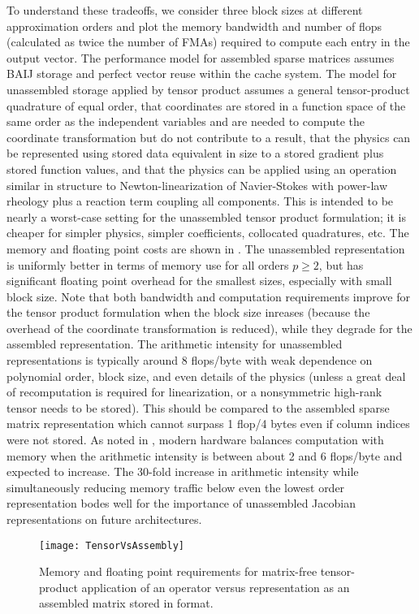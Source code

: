 To understand these tradeoffs, we consider three block sizes at different approximation orders and plot the memory bandwidth and number of flops (calculated as twice the number of FMAs) required to compute each entry in the output vector.
The performance model for assembled sparse matrices assumes BAIJ storage and perfect vector reuse within the cache system.
The model for unassembled storage applied by tensor product assumes a general tensor-product quadrature of equal order, that coordinates are stored in a function space of the same order as the independent variables and are needed to compute the coordinate transformation but do not contribute to a result, that the physics can be represented using stored data equivalent in size to a stored gradient plus stored function values, and that the physics can be applied using an operation similar in structure to Newton-linearization of Navier-Stokes with power-law rheology plus a reaction term coupling all components.
This is intended to be nearly a worst-case setting for the unassembled tensor product formulation; it is cheaper for simpler physics, simpler coefficients, collocated quadratures, etc.
The memory and floating point costs are shown in .
The unassembled representation is uniformly better in terms of memory use for all orders $p \ge 2$, but has significant floating point overhead for the smallest sizes, especially with small block size.
Note that both bandwidth and computation requirements improve for the tensor product formulation when the block size inreases (because the overhead of the coordinate transformation is reduced), while they degrade for the assembled representation.
The arithmetic intensity for unassembled representations is typically around 8 flops/byte with weak dependence on polynomial order, block size, and even details of the physics (unless a great deal of recomputation is required for linearization, or a nonsymmetric high-rank tensor needs to be stored).
This should be compared to the assembled sparse matrix representation which cannot surpass 1 flop/4 bytes even if column indices were not stored.
As noted in , modern hardware balances computation with memory when the arithmetic intensity is between about 2 and 6 flops/byte and expected to increase.
The 30-fold increase in arithmetic intensity while simultaneously reducing memory traffic below even the lowest order representation bodes well for the importance of unassembled Jacobian representations on future architectures.

\begin{figure}
  \centering
  \texttt{[image: TensorVsAssembly]}
  \caption{Memory and floating point requirements for matrix-free tensor-product application of an operator versus representation as an assembled matrix stored in \BAIJ[b] format.}\label{fig:tensorasm}
\end{figure}

